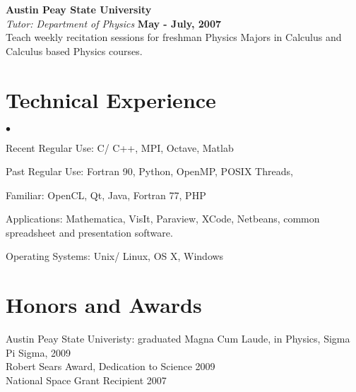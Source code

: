 \documentclass[margin,line]{res}
\newenvironment{list2}{
  \begin{list}{$\bullet$}{%
      \setlength{\itemsep}{0in}
      \setlength{\parsep}{0in} \setlength{\parskip}{0in}
      \setlength{\topsep}{0in} \setlength{\partopsep}{0in} 
      \setlength{\leftmargin}{0.2in}}}{\end{list}}
\begin{document}
\begin{resume}
{\bf Austin Peay State University}\\
{\em Tutor: Department of Physics} \hfill {\bf May - July, 2007}\\
Teach weekly recitation sessions for freshman Physics Majors in Calculus and Calculus based Physics courses. 





%

\section {\sc Technical Experience}
\begin{list2}
	\item Recent Regular Use: C/ C++, MPI, Octave, Matlab
	\item Past Regular Use: Fortran 90, Python, OpenMP, POSIX Threads, 
	\item Familiar: OpenCL, Qt, Java, Fortran 77, PHP
	\item Applications: Mathematica, VisIt, Paraview, XCode, Netbeans, common spreadsheet and presentation software.  
	\item Operating Systems: Unix/ Linux, OS X, Windows
\end{list2}



\section{\sc Honors and Awards} 
Austin Peay State Univeristy: graduated Magna Cum Laude, in Physics, Sigma Pi Sigma, 2009 \\
Robert Sears Award, Dedication to Science 2009 \\
National Space Grant Recipient 2007 \\




\end{resume}
\end{document}
